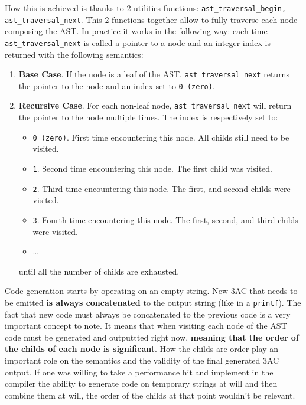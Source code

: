 \documentclass[a4paper]{article}
\begin{document}
How this is achieved is thanks to 2 utilities functions: \texttt{ast\_traversal\_begin, ast\_traversal\_next}. This 2 functions together
allow to fully traverse each node composing the AST. In practice it works in the following way: each time \texttt{ast\_traversal\_next} is called a pointer to a node
and an integer index is returned with the following semantics:
\begin{enumerate}
    \item \textbf{Base Case}. If the node is a leaf of the AST, \texttt{ast\_traversal\_next} returns the pointer to the node and an index set to \texttt{0 (zero)}.
    \item \textbf{Recursive Case}. For each non-leaf node, \texttt{ast\_traversal\_next} will return the pointer to the node multiple times. The index is respectively
        set to:
        \begin{itemize}
            \item \texttt{0 (zero)}. First time encountering this node. All childs still need to be visited.
            \item \texttt{1}. Second time encountering this node. The first child was visited.
            \item \texttt{2}. Third time encountering this node. The first, and second childs were visited.
            \item \texttt{3}. Fourth time encountering this node. The first, second, and third childs were visited.
            \item \dots
        \end{itemize}

        until all the number of childs are exhausted.

\end{enumerate}

Code generation starts by operating on an empty string. New 3AC that needs to be emitted \textbf{is always concatenated} to the output string (like in a \texttt{printf}).
The fact that new code must always be concatenated to the previous code is a very important concept to note. It means
that when visiting each node of the AST code must be generated and outputtted right now, \textbf{meaning that the order of the childs of each node is significant}.
How the childs are order play an important role on the semantics and the validity of the final generated 3AC output.
If one was willing to take a performance hit and implement in the compiler the ability to generate code on temporary strings at will and then combine them at will, the order of the childs at that point wouldn't be relevant.
\end{document}
